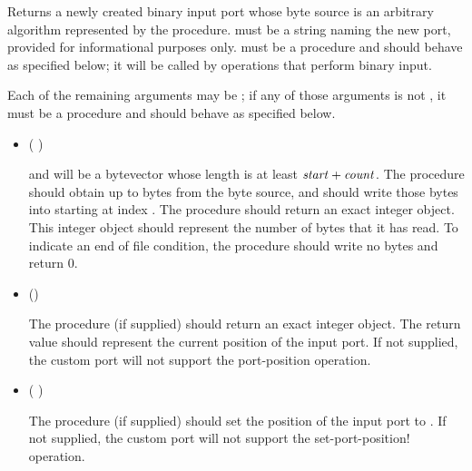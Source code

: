 \begin{entry}{%
}

Returns a newly created binary input port whose byte source is
an arbitrary algorithm represented by the  procedure.
 must be a string naming the new port,
provided for informational purposes only.
 must be a procedure and should behave as specified
below; it will be called by operations that perform binary input.

Each of the remaining arguments may be \schfalse{}; if any of
those arguments is not \schfalse{}, it must be a procedure and
should behave as specified below.
   
\begin{itemize}
\item {\cf (   )}
       
  and  will be a bytevector whose length is at least
  $\textnormal{\textit{start}} + \textnormal{\textit{count}}$.
  The  procedure should obtain up to  bytes
  from the byte source, and should write those bytes
  into  starting at index .
  The  procedure should return an exact integer object.  This
  integer object should represent the number of bytes that it has read.
  To indicate an end of file condition, the 
  procedure should write no bytes and return 0.

\item {\cf ()}
       
  The  procedure (if supplied) should return an exact
  integer object.  The return value should represent the current position of
  the input port.  If not supplied, the custom port will not support
  the {\cf port-position} operation.
  
\item {\cf ( )}
       
  The  procedure (if supplied) should set the
  position of the input port to .  If not supplied, the custom
  port will not support the {\cf set-port-position!} operation.
       

\end{itemize}
\end{entry}
